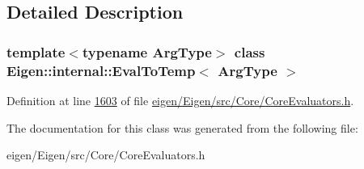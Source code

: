 \subsection{Detailed Description}
\subsubsection*{template$<$typename Arg\+Type$>$\newline
class Eigen\+::internal\+::\+Eval\+To\+Temp$<$ Arg\+Type $>$}



Definition at line \hyperlink{eigen_2_eigen_2src_2_core_2_core_evaluators_8h_source_l01603}{1603} of file \hyperlink{eigen_2_eigen_2src_2_core_2_core_evaluators_8h_source}{eigen/\+Eigen/src/\+Core/\+Core\+Evaluators.\+h}.



The documentation for this class was generated from the following file\+:\begin{DoxyCompactItemize}
\item 
eigen/\+Eigen/src/\+Core/\+Core\+Evaluators.\+h\end{DoxyCompactItemize}
